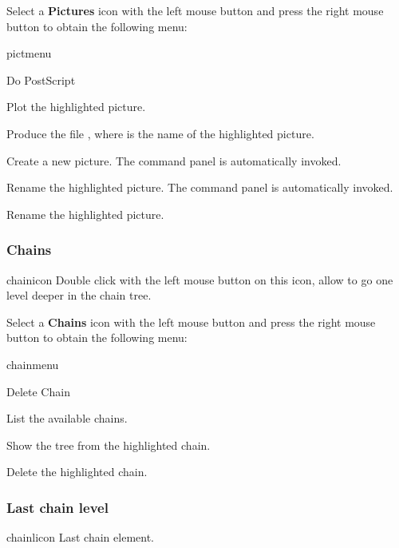 Select a {\bf Pictures} icon with the left mouse button and press
the right mouse button to obtain the following menu:

\begin{PAWf}[.25]{pictmenu}
\begin{DLsf}{Do PostScript}
\item[Plot]             Plot the highlighted picture.
\item[Do PostScript]    Produce the \PS{} file , where
                         is the name of the highlighted picture.
\item[Create]           Create a new picture. The command panel
                         is automatically invoked.
\item[Rename]           Rename the highlighted picture. The command panel
                         is automatically invoked.
\item[Delete]           Rename the highlighted picture.
\end{DLsf}
\end{PAWf}

\subsubsection{Chains}
\begin{ICON}{chainicon}
Double click with the left mouse button on this icon, allow to go one level
deeper in the chain tree.
\end{ICON}

Select a {\bf Chains} icon with the left mouse button and press
the right mouse button to obtain the following menu:

\begin{PAWf}[.2]{chainmenu}
\begin{DLsf}{Delete Chain}
\item[List]                      List the available chains.
\item[Show Tree]                 Show the tree from the highlighted chain.
\item[Delete Chain]              Delete the highlighted chain.
\end{DLsf}
\end{PAWf}

\subsubsection{Last chain level}
\begin{ICON}{chainlicon}
Last chain element.
\end{ICON}

